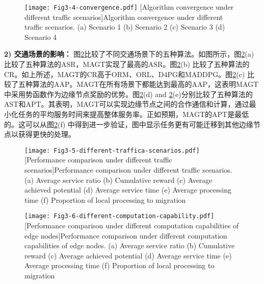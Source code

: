 \begin{figure}[h]
\centering
  \texttt{[image: Fig3-4-convergence.pdf]}
  [Algorithm convergence under different traffic scenarios]{Algorithm convergence under different traffic scenarios. (a) Scenario 1 (b) Scenario 2 (c) Scenario 3 (d) Scenario 4}
  \label{fig 3-4}
\end{figure} 

\textbf{2) 交通场景的影响：} 图\ref{fig 3-5}比较了不同交通场景下的五种算法。如图所示，图\ref{fig 3-5}(a)比较了五种算法的ASR，MAGT实现了最高的ASR。图\ref{fig 3-5}(b) 比较了五种算法的CR。如上所述，MAGT的CR高于ORM、ORL、D4PG和MADDPG。图\ref{fig 3-5}(c) 比较了五种算法的AAP。MAGT在所有场景下都能达到最高的AAP，这表明MAGT中采用势函数作为边缘节点奖励的优势。图\ref{fig 3-5}(d) and \ref{fig 3-5}(e)分别比较了五种算法的AST和APT。其表明，MAGT可以实现边缘节点之间的合作通信和计算，通过最小化任务的平均服务时间来提高整体服务率。正如预期，MAGT的APT是最低的。这可以从图\ref{fig 3-5}(f) 中得到进一步验证，图中显示任务更有可能迁移到其他边缘节点以获得更快的处理。

\begin{figure}[h]
\centering
  \texttt{[image: Fig3-5-different-traffica-scenarios.pdf]}
  [Performance comparison under different traffic scenarios]{Performance comparison under different traffic scenarios. (a) Average service ratio (b) Cumulative reward (c) Average achieved potential (d) Average service time (e) Average processing time (f) Proportion of local processing to migration}
  \label{fig 3-5}
\end{figure}

\begin{figure}[h]
\centering
  \texttt{[image: Fig3-6-different-computation-capability.pdf]}
  [Performance comparison under different computation capabilities of edge nodes]{Performance comparison under different computation capabilities of edge nodes. (a) Average service ratio (b) Cumulative reward (c) Average achieved potential (d) Average service time (e) Average processing time (f) Proportion of local processing to migration}
  \label{fig 3-6}
\end{figure}

